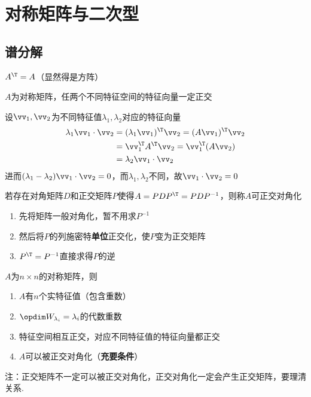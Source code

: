 
\section{对称矩阵与二次型}
\subsection{谱分解}
\begin{definition}[对称矩阵]
$A^\T =A$（显然得是方阵）
\end{definition}
\begin{theorem}
$A$为对称矩阵，任两个不同特征空间的特征向量一定正交
\end{theorem}
\begin{analysis}
设$\vv_1,\vv_2$为不同特征值$\lambda_1,\lambda_2$对应的特征向量
\[\begin{aligned}\lambda_1\vv_1\cdot\vv_2&=(\lambda_1\vv_1)^\T \vv_2=(A\vv_1)^\T \vv_2\\
&=\vv_1^\T A^\T \vv_2=\vv_1^\T (A\vv_2)\\
&=\lambda_2\vv_1\cdot\vv_2\end{aligned}\]
进而$(\lambda_1-\lambda_2)\vv_1\cdot\vv_2=0$，而$\lambda_1,\lambda_2$不同，故$\vv_1\cdot\vv_2=0$
\end{analysis}
\begin{definition}[正交对角化]
若存在对角矩阵$D$和正交矩阵$P$使得$A=PDP^\T =PDP^{-1}$，则称$A$可正交对角化
\end{definition}
\begin{myalgorithm}[正交对角化]\mbox{}\par
\begin{enumerate}
	\itemsep -3pt
	\item 先将矩阵一般对角化，暂不用求$P^{-1}$
	\item 然后将$P$的列施密特\textbf{单位}正交化，使$P$变为正交矩阵
	\item $P^\T =P^{-1}$直接求得$P$的逆
\end{enumerate}
\end{myalgorithm}
\begin{theorem}[谱定理]
$A$为$n\times n$的对称矩阵，则
\begin{enumerate}
	\itemsep -3pt
	\item $A$有$n$个实特征值（包含重数）
	\item $\opdim W_{\lambda_i}=\lambda_i$的代数重数
	\item 特征空间相互正交，对应不同特征值的特征向量都正交
	\item $A$可以被正交对角化（\textbf{充要条件}）
\end{enumerate}
注：正交矩阵不一定可以被正交对角化，正交对角化一定会产生正交矩阵，要理清关系.
\end{theorem}
